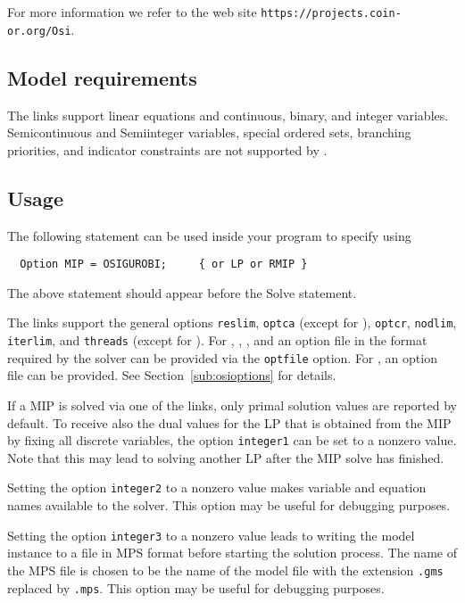 For more information we refer to the \OSI web site \texttt{https://projects.coin-or.org/Osi}.

\subsection{Model requirements}

The \OSI links support linear equations and continuous, binary, and integer variables.
Semicontinuous and Semiinteger variables, special ordered sets, branching priorities, and indicator constraints are not supported by \OSI.

\subsection{Usage}

The following statement can be used inside your \GAMS program to specify using \OSIGUROBI
\begin{verbatim}
  Option MIP = OSIGUROBI;     { or LP or RMIP }
\end{verbatim}

The above statement should appear before the Solve statement.

The links support the general \GAMS options \texttt{reslim}, \texttt{optca} (except for \OSIGLPK), \texttt{optcr}, \texttt{nodlim}, \texttt{iterlim}, and \texttt{threads} (except for \OSIGLPK).
For \OSICPLEX, \OSIGUROBI, \OSIMOSEK, and \OSIXPRESS an option file in the format required by the solver can be provided via the \GAMS \texttt{optfile} option.
For \OSIGLPK, an \GAMS option file can be provided.
See Section~\ref{sub:osioptions} for details.

If a MIP is solved via one of the \OSI links, only primal solution values are reported by default.
To receive also the dual values for the LP that is obtained from the MIP by fixing all discrete variables, the \GAMS option \texttt{integer1} can be set to a nonzero value. Note that this may lead to solving another LP after the MIP solve has finished.

Setting the \GAMS option \texttt{integer2} to a nonzero value makes variable and equation names available to the solver.
This option may be useful for debugging purposes.

Setting the \GAMS option \texttt{integer3} to a nonzero value leads to writing the model instance to a file in MPS format before starting the solution process.
The name of the MPS file is chosen to be the name of the \GAMS model file with the extension \texttt{.gms} replaced by \texttt{.mps}.
This option may be useful for debugging purposes.

